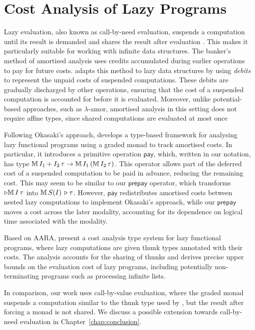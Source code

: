 \section{Cost Analysis of Lazy Programs}
\label{sec:rw-lazy}
Lazy evaluation, also known as call-by-need evaluation, suspends a computation until
its result is demanded and shares the result after evaluation
\citep{launchburyNaturalSemanticsLazy1993a}. This makes it particularly suitable for working with infinite data structures. 
The banker's method of amortised analysis uses credits accumulated during earlier operations to pay for future costs. \cite{okasak} adapts this method to lazy data structures by using \emph{debits} to represent the unpaid costs of suspended computations. These debits are gradually discharged by other operations, ensuring that the cost of a suspended computation is accounted for before it is evaluated.
Moreover, unlike potential-based approaches, such as $\lambda$-amor, amortised analysis in this setting does not require affine types, since shared computations are evaluated at most once

Following Okasaki's approach, \cite{Danielsson08} develops a type-based framework for analysing lazy functional programs using a graded monad to track amortised costs. In particular, it introduces a primitive operation $\mathsf{pay}$, which, written in our notation, has type
$\mathbb{M}\,{I_1+I_2}\, \tau \to \mathbb{M}\,{I_1}\, (\mathbb{M}\,{I_2}\, \tau)$.
This operator allows part of the deferred cost of a suspended computation to be paid in advance, reducing the remaining cost. 
This may seem to be similar to our $\mathsf{prepay}$ operator, which transforms $\triangleright\mathbb{M}\,{I}\, \tau$ into $\mathbb{M}\,{S(I)}\, \triangleright\tau$. However, $\mathsf{pay}$ redistributes amortised costs between nested lazy computations to implement Okasaki's approach, while our $\mathsf{prepay}$ moves a cost 
across the later modality, accounting for its dependence on logical time associated with the modality.

Based on AARA, \cite{jostTypeBasedCostAnalysis2017a} present a cost analysis type system
for lazy functional programs, where lazy computations are given
thunk types annotated with their costs. The analysis accounts for the
sharing of thunks and derives precise upper bounds on the evaluation cost of lazy
programs, including potentially non-terminating programs such as processing infinite lists.

In comparison, our work uses call-by-value evaluation, where the graded monad suspends a
computation similar to the thunk type used by \cite{jostTypeBasedCostAnalysis2017a}, but the result after forcing a monad is not shared.
We discuss a possible extension towards call-by-need evaluation in
Chapter~\ref{chap:conclusion}.

